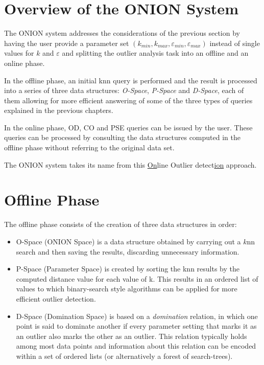 \documentclass[runningheads]{llncs}
\begin{document}
\section{Overview of the ONION System}
The ONION system \cite{onion} addresses the considerations of the previous section by having the user provide a parameter set $(k_{min},k_{max},\varepsilon_{min},\varepsilon_{max})$ instead of single values for $k$ and $\varepsilon$ and splitting the outlier analysis task into an offline and an online phase.

In the offline phase, an initial knn query is performed and the result is processed into a series of three data structures: \emph{O-Space}, \emph{P-Space} and \emph{D-Space}, each of them allowing for more efficient answering of some of the three types of queries explained in the previous chapters.

In the online phase, OD, CO and PSE queries can be issued by the user. These queries can be processed by consulting the data structures computed in the offline phase without referring to the original data set.

The ONION system takes its name from this \underline{On}line Outlier detect\underline{ion} approach.

\section{Offline Phase}

The offline phase consists of the creation of three data structures in order:

\begin{itemize}
 \item O-Space (ONION Space) is a data structure obtained by carrying out a $k$nn search and then saving the results, discarding unnecessary information.
 \item P-Space (Parameter Space) is created by sorting the knn results by the computed distance value for each value of k. This results in an ordered list of values to which binary-search style algorithms can be applied for more efficient outlier detection.
 \item D-Space (Domination Space) is based on a \emph{domination} relation, in which one point is said to dominate another if every parameter setting that marks it as an outlier also marks the other as an outlier. This relation typically holds among most data points and information about this relation can be encoded within a set of ordered lists (or alternatively a forest of search-trees).
\end{itemize}
\end{document}
